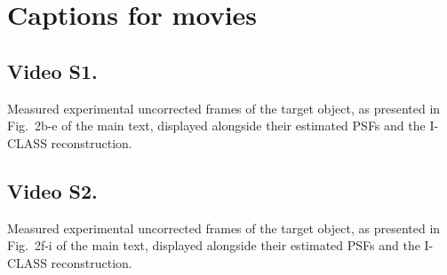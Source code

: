 \documentclass[pdflatex,sn-mathphys-num,Numbered]{sn-jnl}%
\theoremstyle{thmstyleone}%
\theoremstyle{thmstyletwo}%
\theoremstyle{thmstylethree}%
\begin{document}
\section*{Captions for movies}

\subsection*{Video S1.}
Measured experimental uncorrected frames of the target object, as presented in Fig.~2b-e of the main text, displayed alongside their estimated PSFs and the I-CLASS reconstruction.

\subsection*{Video S2.}
Measured experimental uncorrected frames of the target object, as presented in Fig.~2f-i of the main text, displayed alongside their estimated PSFs and the I-CLASS reconstruction.

\newpage



\end{document}
